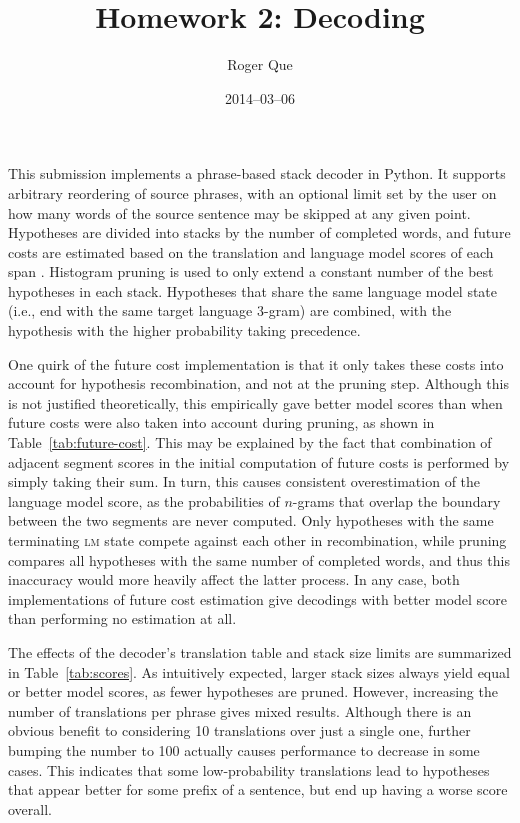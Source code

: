 \documentclass[11pt,twocolumn]{article}
\begin{document}
\title{Homework 2: Decoding}
\author{Roger Que}
\date{2014--03--06}
\maketitle

This submission implements a phrase-based stack decoder in Python.
It supports arbitrary reordering of source phrases, with an optional
limit set by the user on how many words of the source sentence may be
skipped at any given point.
Hypotheses are divided into stacks by the number of completed words,
and future costs are estimated based on the translation and language
model scores of each span \cite{Koehn:2010}.
Histogram pruning is used to only extend a constant number of the best
hypotheses in each stack.
Hypotheses that share the same language model state (i.e., end with the
same target language 3-gram) are combined, with the hypothesis with the
higher probability taking precedence.

One quirk of the future cost implementation is that it only takes these
costs into account for hypothesis recombination, and not at the pruning
step.
Although this is not justified theoretically, this empirically gave
better model scores than when future costs were also taken into account
during pruning, as shown in Table~\ref{tab:future-cost}.
This may be explained by the fact that combination of adjacent segment
scores in the initial computation of future costs is performed by simply
taking their sum.
In turn, this causes consistent overestimation of the language model
score, as the probabilities of $n$-grams that overlap the boundary
between the two segments are never computed.
Only hypotheses with the same terminating \textsc{lm} state compete
against each other in recombination,
while pruning compares all hypotheses with the same number of completed
words,
and thus this inaccuracy would more heavily affect the latter process.
In any case, both implementations of future cost estimation give
decodings with better model score than performing no estimation at all.

The effects of the decoder's translation table and stack size limits are
summarized in Table~\ref{tab:scores}.
As intuitively expected, larger stack sizes always yield equal or better
model scores, as fewer hypotheses are pruned.
However, increasing the number of translations per phrase gives mixed
results.
Although there is an obvious benefit to considering 10 translations over
just a single one, further bumping the number to 100 actually causes
performance to decrease in some cases.
This indicates that some low-probability translations lead to hypotheses
that appear better for some prefix of a sentence, but end up having a
worse score overall.
\end{document}
